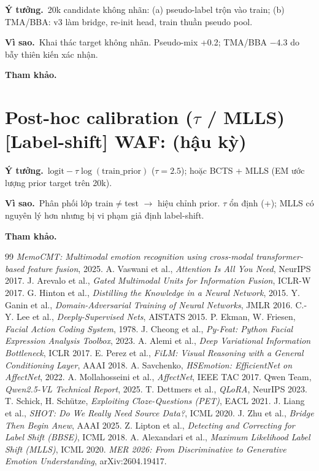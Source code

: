 \documentclass[10pt]{article}
\begin{document}
\textbf{Ý tưởng.}\ 20k candidate không nhãn: (a) pseudo-label trộn vào train; (b) TMA/BBA: v3 làm bridge, re-init head, train thuần pseudo pool.

\textbf{Vì sao.}\ Khai thác target không nhãn. Pseudo-mix +0.2; TMA/BBA $-4.3$ do bẫy thiên kiến xác nhận.

\textbf{Tham khảo.}\ \cite{liang2020shot,zhu2025bba}

\clearpage
\section*{Post-hoc calibration ($\tau$ / MLLS) \quad\normalsize\textnormal{[Label-shift]} \hfill \small WAF: (hậu kỳ)}

\textbf{Ý tưởng.}\ $\text{logit}-\tau\log(\text{train\_prior})$ ($\tau=2.5$); hoặc BCTS + MLLS (EM ước lượng prior target trên 20k).

\textbf{Vì sao.}\ Phân phối lớp train$\neq$test $\to$ hiệu chỉnh prior. $\tau$ ổn định (+); MLLS có nguyên lý hơn nhưng bị vi phạm giả định label-shift.

\textbf{Tham khảo.}\ \cite{lipton2018,alexandari2020}


\begin{thebibliography}{99}
 \emph{MemoCMT: Multimodal emotion recognition using cross-modal transformer-based feature fusion}, 2025.
 A. Vaswani et al., \emph{Attention Is All You Need}, NeurIPS 2017.
 J. Arevalo et al., \emph{Gated Multimodal Units for Information Fusion}, ICLR-W 2017.
 G. Hinton et al., \emph{Distilling the Knowledge in a Neural Network}, 2015.
 Y. Ganin et al., \emph{Domain-Adversarial Training of Neural Networks}, JMLR 2016.
 C.-Y. Lee et al., \emph{Deeply-Supervised Nets}, AISTATS 2015.
 P. Ekman, W. Friesen, \emph{Facial Action Coding System}, 1978.
 J. Cheong et al., \emph{Py-Feat: Python Facial Expression Analysis Toolbox}, 2023.
 A. Alemi et al., \emph{Deep Variational Information Bottleneck}, ICLR 2017.
 E. Perez et al., \emph{FiLM: Visual Reasoning with a General Conditioning Layer}, AAAI 2018.
 A. Savchenko, \emph{HSEmotion: EfficientNet on AffectNet}, 2022.
 A. Mollahosseini et al., \emph{AffectNet}, IEEE TAC 2017.
 Qwen Team, \emph{Qwen2.5-VL Technical Report}, 2025.
 T. Dettmers et al., \emph{QLoRA}, NeurIPS 2023.
 T. Schick, H. Sch\"utze, \emph{Exploiting Cloze-Questions (PET)}, EACL 2021.
 J. Liang et al., \emph{SHOT: Do We Really Need Source Data?}, ICML 2020.
 J. Zhu et al., \emph{Bridge Then Begin Anew}, AAAI 2025.
 Z. Lipton et al., \emph{Detecting and Correcting for Label Shift (BBSE)}, ICML 2018.
 A. Alexandari et al., \emph{Maximum Likelihood Label Shift (MLLS)}, ICML 2020.
 \emph{MER 2026: From Discriminative to Generative Emotion Understanding}, arXiv:2604.19417.
\end{thebibliography}
\end{document}
